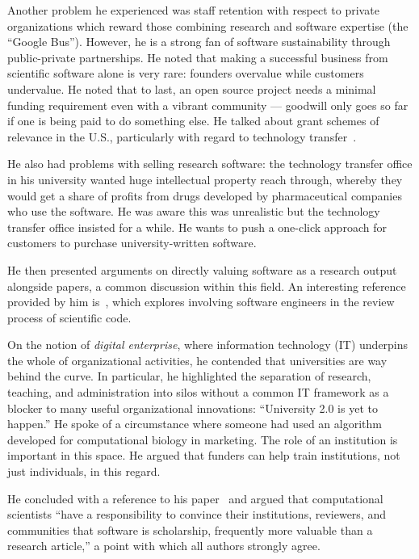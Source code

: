 \documentclass[11pt, oneside]{amsart}
\begin{document}
Another problem he experienced was staff retention with respect to
private organizations which reward those combining research and
software expertise (the ``Google Bus''). However, he is a strong fan
of software sustainability through public-private partnerships. He
noted that making a successful business from scientific software alone
is very rare: founders overvalue while customers undervalue. He noted
that to last, an open source project needs a minimal funding
requirement even with a vibrant community --- goodwill only goes so
far if one is being paid to do something else.  He talked about grant
schemes of relevance in the U.S., particularly with regard to
technology transfer~\cite{sbir-web, fased-web}.

He also had problems with selling research software: the technology
transfer office in his university wanted huge intellectual property
reach through, whereby they would get a share of profits from drugs
developed by pharmaceutical companies who use the software.  He was
aware this was unrealistic but the technology transfer office insisted
for a while. He wants to push a one-click approach for customers to
purchase university-written software.

He then presented arguments on directly valuing software as
a research output alongside papers, a common discussion within this field.
An interesting reference provided by him
is~\cite{peer-review-code}, which explores involving software
engineers in the review process of scientific code.

On the notion of \emph{digital enterprise}, where information
technology (IT) underpins the whole of organizational activities, he
contended that universities are way behind the curve. In
particular, he highlighted the separation of research, teaching, and
administration into silos without a common IT framework as a blocker
to many useful organizational innovations: ``University 2.0 is yet to
happen.'' He spoke of a circumstance where someone had used an
algorithm developed for computational biology in marketing.
The role of an institution is important in this space. He argued that
funders can help train institutions, not just individuals, in this regard.

He concluded with a reference to his paper~\cite{bourne_ten} and
argued that computational scientists ``have a responsibility to
convince their institutions, reviewers, and communities that software is
scholarship, frequently
more valuable than a research article,'' a point with which all authors
strongly agree.
\end{document}
